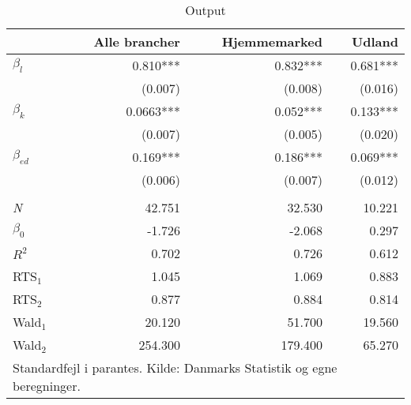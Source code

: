 \begin{table}[tb]
\centering
\caption{Output}
\label{tab:OutputAlleUdeHjemme}
\begin{tabular}{@{}lrrr@{}}
\toprule
             & Alle brancher & Hjemmemarked & Udland   \\
             \midrule
$\beta_l$    & 0.810***      & 0.832***     & 0.681*** \\
             & (0.007)       & (0.008)      & (0.016)  \\
$\beta_k$    & 0.0663***     & 0.052***     & 0.133*** \\
             & (0.007)       & (0.005)      & (0.020)  \\
$\beta_{ed}$ & 0.169***      & 0.186***     & 0.069*** \\
             & (0.006)       & (0.007)      & (0.012)  \\
             &               &              &          \\
\emph{N}   & 42.751        & 32.530       & 10.221   \\
$\beta_0$    & -1.726        & -2.068       & 0.297    \\
$R^2$        & 0.702         & 0.726        & 0.612    \\
RTS$_1$      & 1.045         & 1.069        & 0.883    \\
RTS$_2$      & 0.877         & 0.884        & 0.814    \\
Wald$_1$     & 20.120        & 51.700       & 19.560   \\
Wald$_2$     & 254.300       & 179.400      & 65.270  \\
\midrule
\multicolumn{4}{p{7cm}}{\raggedright Standardfejl i parantes. Kilde: Danmarks Statistik og egne beregninger.} \\
\bottomrule 
\end{tabular}
\end{table}